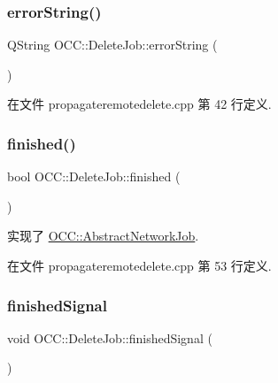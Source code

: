 \subsubsection{\texorpdfstring{error\+String()}{errorString()}}
{\footnotesize\ttfamily Q\+String O\+C\+C\+::\+Delete\+Job\+::error\+String (\begin{DoxyParamCaption}{ }\end{DoxyParamCaption})}



在文件 propagateremotedelete.\+cpp 第 42 行定义.

\mbox{\label{class_o_c_c_1_1_delete_job_a5776804580c1eee33e5bf72a614a49f1}} 
\subsubsection{\texorpdfstring{finished()}{finished()}}
{\footnotesize\ttfamily bool O\+C\+C\+::\+Delete\+Job\+::finished (\begin{DoxyParamCaption}{ }\end{DoxyParamCaption})\hspace{0.3cm}{\ttfamily [virtual]}}



实现了 \hyperlink{class_o_c_c_1_1_abstract_network_job_af811f7299d7e526678a8758f2e7102d2}{O\+C\+C\+::\+Abstract\+Network\+Job}.



在文件 propagateremotedelete.\+cpp 第 53 行定义.

\mbox{\label{class_o_c_c_1_1_delete_job_aedea38cf84339ae970fbc046ab7ade0c}} 
\subsubsection{\texorpdfstring{finished\+Signal}{finishedSignal}}
{\footnotesize\ttfamily void O\+C\+C\+::\+Delete\+Job\+::finished\+Signal (\begin{DoxyParamCaption}{ }\end{DoxyParamCaption})\hspace{0.3cm}{\ttfamily [signal]}}

